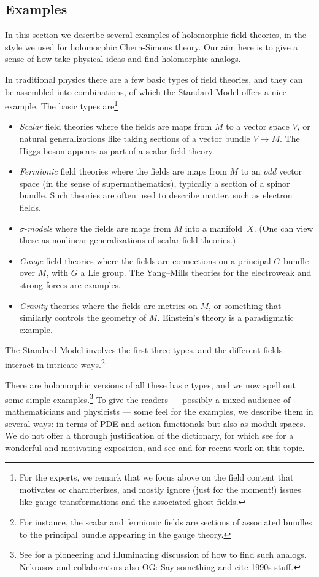\documentclass[11pt]{amsart}
\def\owen#1{{\textcolor{violet!50!black}{OG: {#1}}}}
\begin{document}
\subsection{Examples}
\label{sec: ex of theories}

In this section we describe several examples of holomorphic field theories,
in the style we used for holomorphic Chern-Simons theory.
Our aim here is to give a sense of how take physical ideas and find holomorphic analogs.

In traditional physics there are a few basic types of field theories, 
and they can be assembled into combinations,
of which the Standard Model offers a nice example.
The basic types are\footnote{For the experts, we remark that we focus above on the field content that motivates or characterizes, and mostly ignore (just for the moment!) issues like gauge transformations and the associated ghost fields.}
\begin{itemize}
\item {\em Scalar} field theories where the fields are maps from $M$ to a vector space $V$, or natural generalizations like taking sections of a vector bundle $V \to M$. The Higgs boson appears as part of a scalar field theory.
\item {\em Fermionic} field theories where the fields are maps from $M$ to an {\em odd} vector space (in the sense of supermathematics), typically a section of a spinor bundle. Such theories are often used to describe matter, such as electron fields.
\item $\sigma$-{\em models} where the fields are maps from $M$ into a manifold~$X$. (One can view these as nonlinear generalizations of scalar field theories.)
\item {\em Gauge} field theories where the fields are connections on a principal $G$-bundle over $M$, with $G$ a Lie group. The Yang--Mills theories for the electroweak and strong forces are examples.
\item {\em Gravity} theories where the fields are metrics on $M$, or something that similarly controls the geometry of $M$. Einstein's theory is a paradigmatic example.
\end{itemize}
The Standard Model involves the first three types,
and the different fields interact in intricate ways.\footnote{For instance, the scalar and fermionic fields are sections of associated bundles to the principal bundle appearing in the gauge theory.}

There are holomorphic versions of all these basic types, 
and we now spell out some simple examples.\footnote{See \cite{Donaldson Thomas} for a pioneering and illuminating discussion of how to find such analogs. Nekrasov and collaborators also \owen{Say something and cite 1990s stuff.}}
To give the readers --- possibly a mixed audience of mathematicians and physicists --- some feel for the examples, 
we describe them in several ways: 
in terms of PDE and action functionals but also as moduli spaces.
We do not offer a thorough justification of the dictionary, for which see \cite{CosSUSY} for a wonderful and motivating exposition,
and see \cite{AlfonsoYoung} and \cite{Steffens} for recent work on this topic.
\end{document}
